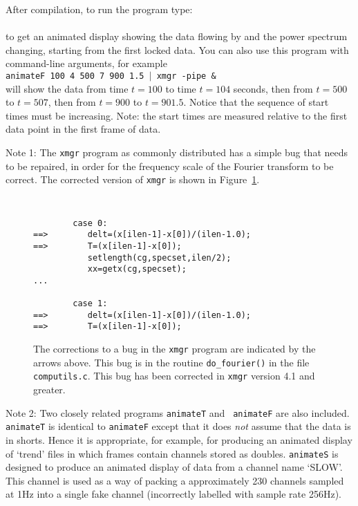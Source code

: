 After compilation, to run the program type:\\
 \\
to get an animated display showing the data flowing by and the power
spectrum changing, starting from the first locked data.  You can also
use this program with command-line arguments, for example\\ \indent
{\tt  animateF 100 4 500 7 900 1.5 $|$ xmgr -pipe \&}\\ will show the
data from time $t= 100$ to time $t=104 $ seconds, then from $t=500$ to
$t=507$, then from $t=900$ to $t=901.5$.  Notice that the sequence of
start times must be increasing.  Note: the start times are measured relative
to the first data point in the first frame of data.

Note 1:  The {\tt xmgr} program as commonly distributed has a simple
bug that needs to be repaired, in order for the frequency scale of the
Fourier transform to be correct.  The corrected version of {\tt xmgr}
is shown in Figure~\ref{f:xmgrbugF}.
\begin{figure}
\hrulefill
{\tt
\begin{verbatim}
        case 0:
==>        delt=(x[ilen-1]-x[0])/(ilen-1.0);
==>        T=(x[ilen-1]-x[0]);
           setlength(cg,specset,ilen/2);
           xx=getx(cg,specset);
...

        case 1:
==>        delt=(x[ilen-1]-x[0])/(ilen-1.0);
==>        T=(x[ilen-1]-x[0]);
\end{verbatim}}
\caption{\label{f:xmgrbugF} The corrections to a bug in the {\tt xmgr}
program are indicated by the arrows above.  This bug is in the routine
{\tt do\_fourier()} in the file {\tt computils.c}. This bug has been
corrected in {\tt xmgr} version 4.1 and greater.}
\hrulefill
\end{figure}


Note 2: Two closely related programs {\tt animateT} and {\tt
    animateF}
are also included.  {\tt animateT} is identical to {\tt animateF}
except that it does {\it not} assume that the data is in shorts.
Hence it is appropriate, for example, for producing an animated
display of `trend' files in which frames contain channels stored as doubles.
{\tt animateS} is designed to produce an animated 
display of  data from a channel name `SLOW'.
This channel is used as a way of packing a approximately 230 channels sampled
at 1Hz into a single fake channel (incorrectly labelled with sample
rate 256Hz). 




